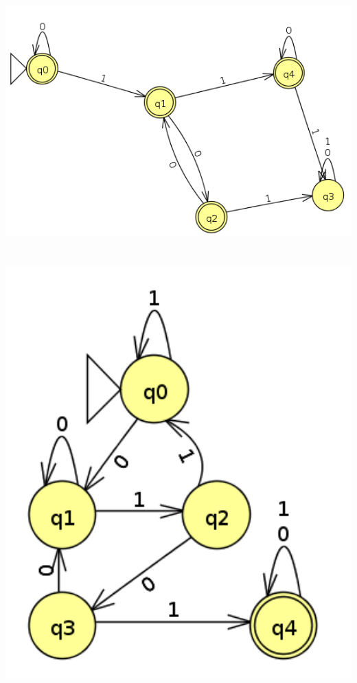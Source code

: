 \documentclass[a4paper,12pt]{article}
\begin{document}
\section{}
\includegraphics[width=15cm]{question6}
\section{}
\includegraphics[width=15cm]{question7}
\end{document}
